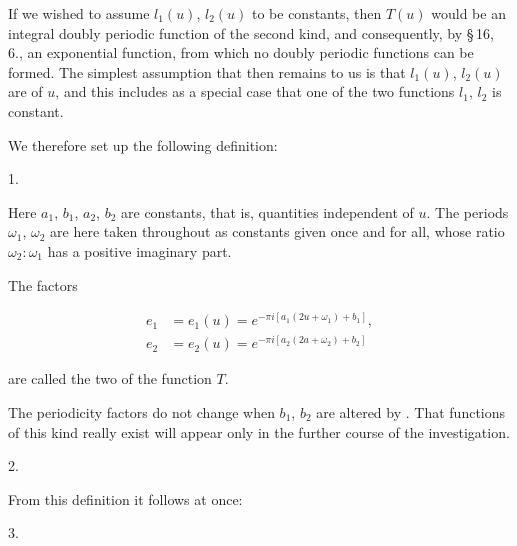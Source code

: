 
If we wished to assume $l_1(u)$, $l_2(u)$ to be constants, then $T(u)$ would be an integral doubly periodic function of the second kind, and consequently, by \S\,16, 6., an exponential function, from which no doubly periodic functions can be formed. The simplest assumption that then remains to us is that $l_1(u)$, $l_2(u)$ are  of $u$, and this includes as a special case that one of the two functions $l_1$, $l_2$ is constant.

We therefore set up the following definition:

1. 


Here $a_1$, $b_1$, $a_2$, $b_2$ are constants, that is, quantities independent of $u$. The periods $\omega_1$, $\omega_2$ are here taken throughout as constants given once and for all, whose ratio $\omega_2:\omega_1$ has a positive imaginary part.

The factors

\[
\begin{aligned}
e_1 &= e_1(u) = e^{-\pi i [a_1(2u+\omega_1)+b_1]},\\
e_2 &= e_2(u) = e^{-\pi i [a_2(2a+\omega_2)+b_2]}
\end{aligned}
\]

are called the two  of the function $T$.

The periodicity factors do not change when $b_1$, $b_2$ are altered by . That functions of this kind really exist will appear only in the further course of the investigation.

2. 

From this definition it follows at once:

3. 
